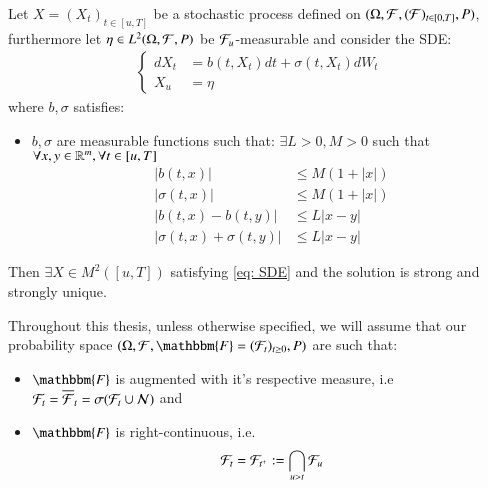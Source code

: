 \begin{theorem}
\label{thm: SDE_sufficiency}
Let $X = (X_{t})_{t\in [u,T]}$ be a stochastic process defined on $(\Omega, \mathcal{F}, (\mathcal{F})_{t\in [0,T]}, P)$, furthermore let $\eta \in L^{2}(\Omega, \mathcal{F}, P)$ be $\mathcal{F}_{u}$-measurable and consider the SDE:
\begin{align}
\label{eq: SDE}
\begin{cases}
      dX_{t} &= b(t,X_{t})dt + \sigma(t,X_{t})dW_{t} \\
      X_{u}  &= \eta
    \end{cases}    
\end{align}
where $b, \sigma$ satisfies:
\begin{itemize}[leftmargin =*]
    \item $b,\sigma$ are measurable functions such that: $\exists L >0, M >0$ such that $\forall x,y \in \mathbb{R}^{m}, \forall t \in [u,T]$ 
    \begin{align*}
    |b(t,x)|                  &\leq M(1+|x|) \\ 
    |\sigma(t,x)|             &\leq M(1+|x|) \\ 
    |b(t,x) - b(t,y)|         &\leq L|x-y| \\ 
    |\sigma(t,x)+\sigma(t,y)| &\leq L|x-y|
    \end{align*}
\end{itemize}
Then $\exists X \in M^{2}([u,T])$ satisfying \ref{eq: SDE} and the solution is strong and strongly unique.
\end{theorem}












\begin{assumption}
Throughout this thesis, unless otherwise specified, we will assume that our probability space $(\Omega, \F, \mathbbm{F} = (\F_{t})_{t\geq 0}, P)$ are such that:
\begin{itemize}[leftmargin =*]
    \item $\mathbbm{F}$ is augmented with it's respective measure, i.e $\mathcal{F}_{t} = \overline{\mathcal{F}}_{t} = \sigma(\mathcal{F}_{t}\cup \mathcal{N})$ and
    \item $\mathbbm{F}$ is right-continuous, i.e. 
    \[
    \mathcal{F}_{t} = \mathcal{F}_{t^{+}}:= \bigcap_{u>t}\mathcal{F}_{u}
    \]
\end{itemize}
\end{assumption}






















